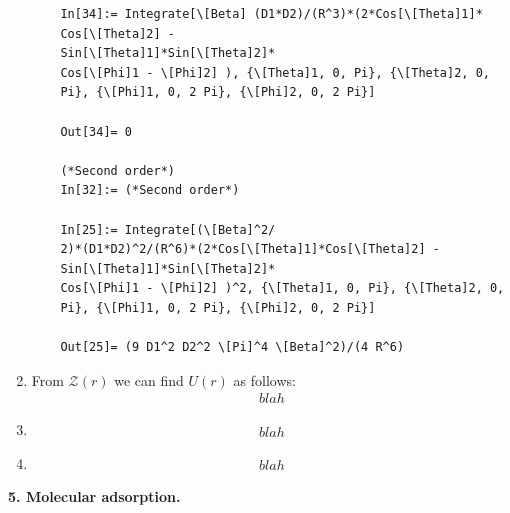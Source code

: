 \documentclass{article}
\theoremstyle{definition}
\begin{document}
\begin{enumerate}[label=(\alph*)]
\begin{lstlisting}
	In[34]:= Integrate[\[Beta] (D1*D2)/(R^3)*(2*Cos[\[Theta]1]*
	Cos[\[Theta]2] - 
	Sin[\[Theta]1]*Sin[\[Theta]2]*
	Cos[\[Phi]1 - \[Phi]2] ), {\[Theta]1, 0, Pi}, {\[Theta]2, 0, 
	Pi}, {\[Phi]1, 0, 2 Pi}, {\[Phi]2, 0, 2 Pi}]
	
	Out[34]= 0
	
	(*Second order*)
	In[32]:= (*Second order*)
	
	In[25]:= Integrate[(\[Beta]^2/
	2)*(D1*D2)^2/(R^6)*(2*Cos[\[Theta]1]*Cos[\[Theta]2] - 
	Sin[\[Theta]1]*Sin[\[Theta]2]*
	Cos[\[Phi]1 - \[Phi]2] )^2, {\[Theta]1, 0, Pi}, {\[Theta]2, 0, 
	Pi}, {\[Phi]1, 0, 2 Pi}, {\[Phi]2, 0, 2 Pi}]
	
	Out[25]= (9 D1^2 D2^2 \[Pi]^4 \[Beta]^2)/(4 R^6)
	\end{lstlisting}
	
	\item From $\mathcal{Z}(r)$ we can find $U(r)$ as follows:
	\begin{align*}
	blah
	\end{align*}
	
	\item 
	\begin{align*}
	blah
	\end{align*}
	
	\item 
	\begin{align*}
	blah
	\end{align*}
\end{enumerate}



\noindent \textbf{5. Molecular adsorption.}
\end{document}

